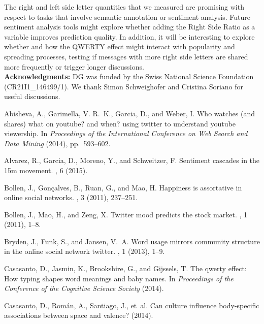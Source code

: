 \documentclass[letterpaper]{sig-alternate-2013}
\begin{document}
The right and left side letter quantities that we measured are promising with
respect to tasks that involve semantic annotation or sentiment analysis.
Future sentiment analysis tools might explore whether adding the Right Side
Ratio as a variable improves prediction quality. In addition, it will be
interesting to explore whether and how the QWERTY effect might interact with
popularity and spreading processes, testing if messages with more right side
letters are shared more frequently or trigger longer discussions.\\

\textbf{Acknowledgments:} 
DG was funded by the Swiss National Science Foundation (CR21I1\_146499/1). We
thank Simon Schweighofer and Cristina Soriano for useful discussions.

\clearpage
\small
\raggedright
\sloppy
\begin{thebibliography}{10}
\vspace{0.2cm}
{\sc Abisheva, A., Garimella, V. R.~K., Garcia, D., and Weber, I.}
\newblock Who watches (and shares) what on youtube? and when? using twitter to
  understand youtube viewership.
\newblock In {\em Proceedings of the International Conference on Web Search and
  Data Mining\/} (2014), pp.~593--602.

{\sc Alvarez, R., Garcia, D., Moreno, Y., and Schweitzer, F.}
\newblock Sentiment cascades in the 15m movement.
, 6 (2015).

{\sc Bollen, J., Gon{\c{c}}alves, B., Ruan, G., and Mao, H.}
\newblock Happiness is assortative in online social networks.
, 3 (2011), 237--251.

{\sc Bollen, J., Mao, H., and Zeng, X.}
\newblock Twitter mood predicts the stock market.
, 1 (2011), 1--8.

{\sc Bryden, J., Funk, S., and Jansen, V.~A.}
\newblock Word usage mirrors community structure in the online social network
  twitter.
, 1 (2013), 1--9.

{\sc Casasanto, D., Jasmin, K., Brookshire, G., and Gijssels, T.}
\newblock The qwerty effect: How typing shapes word meanings and baby names.
\newblock In {\em Proceedings of the Conference of the Cognitive Science
  Society\/} (2014).

{\sc Casasanto, D., Rom{\'a}n, A., Santiago, J., et~al.}
\newblock Can culture influence body-specific associations between space and
  valence?
 (2014).


\end{thebibliography}
\end{document}
